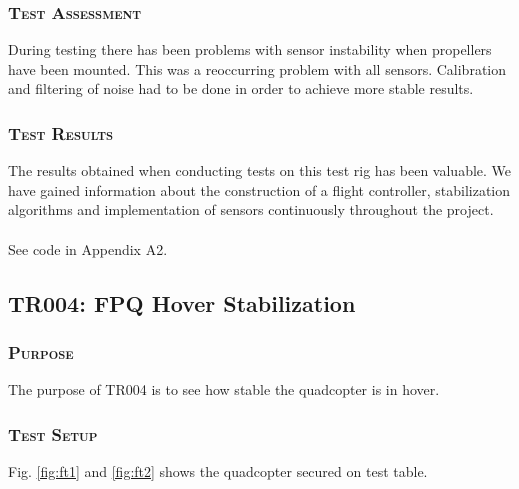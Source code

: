 \subsubsection*{\textsc{\medium Test Assessment}}
During testing there has been problems with sensor instability when propellers have been mounted. This was a reoccurring problem with all sensors. Calibration and filtering of noise had to be done in order to achieve more stable results.

\subsubsection*{\textsc{\medium Test Results}}
The results obtained when conducting tests on this test rig has been valuable. We have gained information about the construction of a flight controller, stabilization algorithms and implementation of sensors continuously throughout the project.\\
\\
See code in Appendix A2.
\newpage


\subsection{TR004: FPQ Hover Stabilization}
         {}
\subsubsection*{\textsc{\medium Purpose}}
The purpose of TR004 is to see how stable the quadcopter is in hover.

\subsubsection*{\textsc{\medium Test Setup}}
Fig. \ref{fig:ft1} and \ref{fig:ft2} shows the quadcopter secured on test table.

